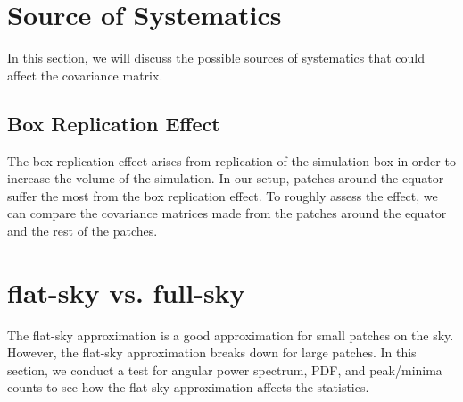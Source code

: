 \section{Source of Systematics}
In this section, we will discuss the possible sources of systematics that could affect the covariance matrix. 

\subsection{Box Replication Effect} \label{sec:boxreplication}
The box replication effect arises from replication of the simulation box in order to increase the volume of the simulation. In our setup, patches around the equator suffer the most from the box replication effect. To roughly assess the effect, we can compare the covariance matrices made from the patches around the equator and the rest of the patches.

\section{flat-sky vs. full-sky}
The flat-sky approximation is a good approximation for small patches on the sky. However, the flat-sky approximation breaks down for large patches. In this section, we conduct a test for angular power spectrum, PDF, and peak/minima counts to see how the flat-sky approximation affects the statistics.